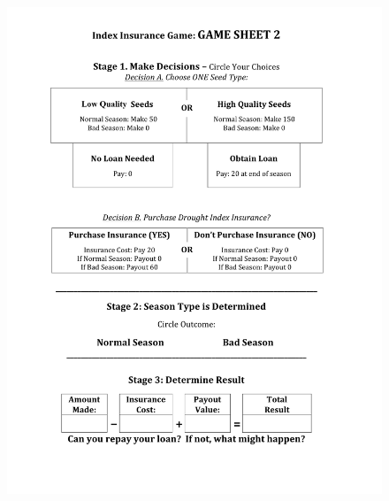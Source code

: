 \documentclass[letterpaper,10pt,english]{sphinxmanual}
\begin{document}
\begin{figure}[htbp]
\centering

\includegraphics{indexinsurancegame2_en1.png}
\end{figure}
\end{document}
